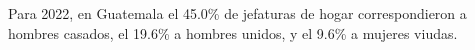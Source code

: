 Para 2022, en Guatemala el 45.0\% de jefaturas de hogar correspondieron a hombres casados, el 19.6\% a hombres unidos, y el 9.6\% a mujeres viudas.